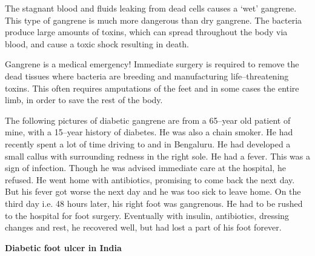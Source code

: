 The stagnant blood and fluids leaking from dead cells causes a ‘wet’ gangrene. This type of gangrene is much more dangerous than dry gangrene. The bacteria produce large amounts of toxins, which can spread throughout the body via blood, and cause a toxic shock resu\-lting in death.

Gangrene is a medical emergency! Immediate surgery is required to remove the dead tissues where bacteria are breeding and manufa\-cturing life–threatening toxins. This often requires amputations of the feet and in some cases the entire limb, in order to save the rest of the body.

The following pictures of diabetic gangrene are from a 65–year old patient of mine, with a 15–year history of diabetes. He was also a chain smoker. He had recently spent a lot of time driving to and in Bengaluru. He had developed a small callus with surrounding redness in the right sole. He had a fever. This was a sign of infection. Though he was advi\-sed immediate care at the hospital, he refused. He went home with antibiotics, promising to come back the next day. But his fever got worse the next day and he was too sick to leave home. On the third day i.e. 48 hours later, his right foot was gangrenous. He had to be rushed to the hospital for foot surgery. Eventually with insulin, antibiotics, dressing changes and rest, he recovered well, but had lost a part of his foot forever.

\noindent\textbf{Diabetic foot ulcer in India}


